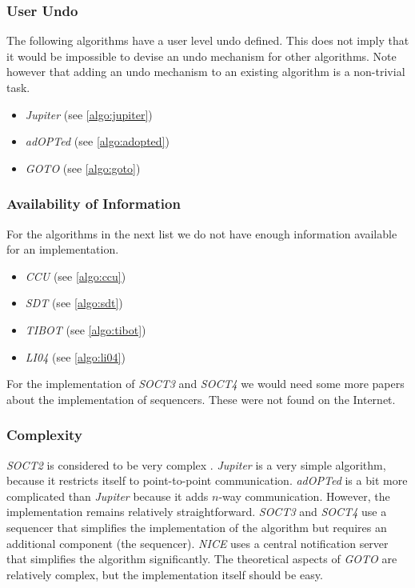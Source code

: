 \subsubsection{User Undo}
The following algorithms have a user level undo defined. This does not imply that it would be impossible to devise an undo mechanism for other algorithms. Note however that adding an undo mechanism to an existing algorithm is a non-trivial task.

\begin{itemize}
 \item \emph{Jupiter} (see \ref{algo:jupiter}) 
 \item \emph{adOPTed} (see \ref{algo:adopted})
 \item \emph{GOTO} (see \ref{algo:goto})
\end{itemize}


\subsubsection{Availability of Information}
For the algorithms in the next list we do not have enough information available for an implementation.

\begin{itemize}
 \item \emph{CCU} (see \ref{algo:ccu})
 \item \emph{SDT} (see \ref{algo:sdt})
 \item \emph{TIBOT} (see \ref{algo:tibot})
 \item \emph{LI04} (see \ref{algo:li04})
\end{itemize}

For the implementation of \emph{SOCT3} and \emph{SOCT4} we would need some more papers about the implementation of sequencers. These were not found on the Internet.


\subsubsection{Complexity}
\emph{SOCT2} is considered to be very complex \cite{imine03b} \cite{sdt}. \emph{Jupiter} is a very simple algorithm, because it restricts itself to point-to-point communication. \emph{adOPTed} is a bit more complicated than \emph{Jupiter} because it adds $n$-way communication. However, the implementation remains relatively straightforward. \emph{SOCT3} and \emph{SOCT4} use a sequencer that simplifies the implementation of the algorithm but requires an additional component (the sequencer). \emph{NICE} uses a central notification server that simplifies the algorithm significantly. The theoretical aspects of \emph{GOTO} are relatively complex, but the implementation itself should be easy. 


